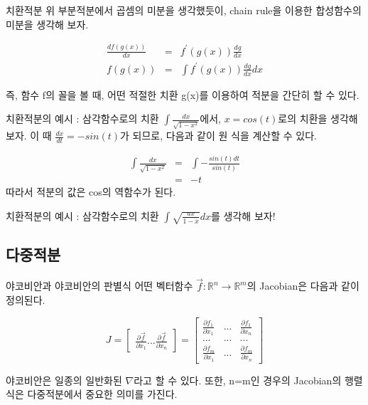 \documentclass{beamer}
\begin{document}
\begin{frame}{치환적분} 
위 부분적분에서 곱셈의 미분을 생각했듯이, chain rule을 이용한 합성함수의 미분을 생각해 보자. 

\begin{eqnarray} 
\frac{d f(g(x))}{dx} &=& f^{\prime}(g(x)) \frac{dg}{dx} \\
f(g(x)) &=& \int f^{\prime} (g(x)) \frac{dg}{dx} dx 
\end{eqnarray} 

즉, 함수 f의 꼴을 볼 때, 어떤 적절한 치환 g(x)를 이용하여 적분을 간단히 할 수 있다. 

\end{frame}


\begin{frame}{치환적분의 예시 : 삼각함수로의 치환} 
$\int \frac{dx}{\sqrt{1-x^2}} $에서, $x=cos(t)$로의 치환을 생각해 보자. 이 때 $\frac{dx}{dt} = -sin(t)$가 되므로, 다음과 같이 원 식을 계산할 수 있다. 

\begin{eqnarray} 
\int \frac{dx}{\sqrt{1-x^2}} &=& \int - \frac{sin(t) dt}{sin(t)} \\ 
&=& -t 
\end{eqnarray} 
따라서 적분의 값은 cos의 역함수가 된다. 
\end{frame}

\begin{frame}{치환적분의 예시 : 삼각함수로의 치환} 
$\int \sqrt{\frac{ax}{1-x}} dx$를 생각해 보자! 

\end{frame}

\subsection{다중적분} 

\begin{frame}[allowframebreaks]{야코비안과 야코비안의 판별식} 
어떤 벡터함수 $\vec{f} : \mathds{R}^n \rightarrow \mathds{R}^{m}$의 Jacobian은 다음과 같이 정의된다. 

\begin{equation} 
J = \left[ \begin{matrix} \frac{\partial \vec{f}}{\partial x_1} ... \frac{\partial \vec{f}}{\partial x_n} \end{matrix} \right]  = 
\left[ \begin{matrix} \frac{\partial f_1}{\partial x_1} & ... & \frac{\partial f_1}{\partial x_n} \\ 
... & ... & ... \\
\frac{\partial f_m}{\partial x_1} & ... & \frac{\partial f_m}{\partial x_n} \end{matrix} \right]
\end{equation}

야코비안은 일종의 일반화된 $\nabla$라고 할 수 있다. 또한, n=m인 경우의 Jacobian의 행렬식은 다중적분에서 중요한 의미를 가진다. 
\end{frame}
\end{document}
